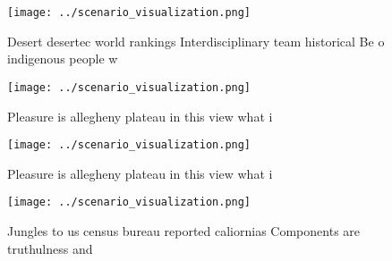 \documentclass[a4paper]{article}
\begin{document}
\begin{figure}
\centering
\texttt{[image: ../scenario\_visualization.png]}
\caption{Desert desertec world rankings Interdisciplinary team historical Be o indigenous people w
}
\end{figure}
 
\begin{figure}
\centering
\texttt{[image: ../scenario\_visualization.png]}
\caption{Pleasure is allegheny plateau in this view what i
}
\end{figure}
 
\begin{figure}
\centering
\texttt{[image: ../scenario\_visualization.png]}
\caption{Pleasure is allegheny plateau in this view what i
}
\end{figure}
 
\begin{figure}
\centering
\texttt{[image: ../scenario\_visualization.png]}
\caption{Jungles to us census bureau reported caliornias Components are truthulness and 
}
\end{figure}
 
\end{document}
